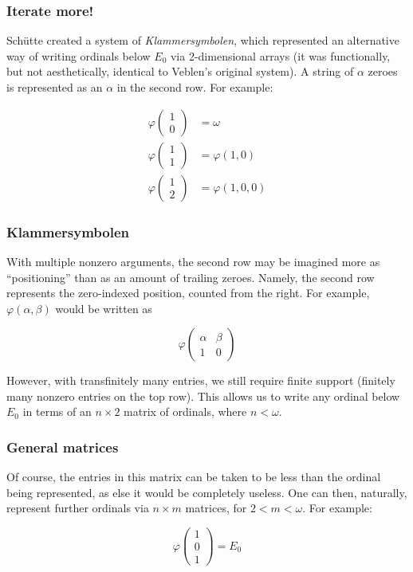 \documentclass{beamer}
\begin{document}
\begin{frame}
\frametitle{Iterate more!}
Schütte created a system of \textit{Klammersymbolen}, which represented an alternative way of writing ordinals below $E_0$ via 2-dimensional arrays (it was functionally, but not aesthetically, identical to Veblen's original system). \pause A string of $\alpha$ zeroes is represented as an $\alpha$ in the second row. For example:

\begin{equation}
\begin{split}
\varphi\left(\begin{matrix} 1 \\ 0\end{matrix}\right) & = \omega \\ \varphi\left(\begin{matrix} 1 \\ 1\end{matrix}\right) & = \varphi(1,0) \\ \varphi\left(\begin{matrix} 1 \\ 2\end{matrix}\right) & = \varphi(1,0,0)
\end{split}
\end{equation}
\end{frame}

\begin{frame}
\frametitle{Klammersymbolen}
With multiple nonzero arguments, the second row may be imagined more as ``positioning'' than as an amount of trailing zeroes. Namely, the second row represents the zero-indexed position, counted from the right. \pause For example, $\varphi(\alpha,\beta)$ would be written as

\begin{equation}
\varphi\left(\begin{matrix} \alpha & \beta \\ 1 & 0\end{matrix}\right)
\end{equation}

\pause

However, with transfinitely many entries, we still require finite support (finitely many nonzero entries on the top row). This allows us to write any ordinal below $E_0$ in terms of an $n \times 2$ matrix of ordinals, where $n < \omega$.
\end{frame}

\begin{frame}
\frametitle{General matrices}
Of course, the entries in this matrix can be taken to be less than the ordinal being represented, as else it would be completely useless. One can then, naturally, represent further ordinals via $n \times m$ matrices, for $2 < m < \omega$. For example:

\begin{equation}
\varphi\left(\begin{matrix} 1 \\ 0 \\ 1\end{matrix}\right) = E_0
\end{equation}
\end{frame}
\end{document}
